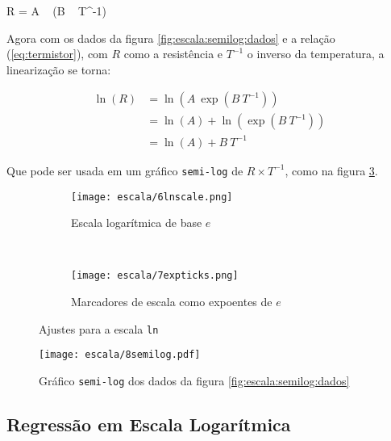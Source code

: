     \begin{equacao} \label{eq:termistor}
        R = A ~ \exp\left(B ~ T^{-1}\right)
    \end{equacao}

    Agora com os dados da figura \ref{fig:escala:semilog:dados} e a relação (\ref{eq:termistor}), com $R$ como a resistência e $T^{-1}$ o inverso da temperatura, a linearização se torna:

    \begin{align*}
        \ln(R)
            &= \ln\left(A ~ \exp\left(B ~ T^{-1}\right) \right) \\
            &= \ln(A) + \ln\left(\exp\left(B ~ T^{-1}\right) \right) \\
            &= \ln(A) + B ~ T^{-1}
    \end{align*}

    Que pode ser usada em um gráfico \texttt{semi-log} de $R \times T^{-1}$, como na figura \ref{fig:escala:tutextra}.

    \begin{figure}[htbp]
        \centering
        \begin{subfigure}{0.45\textwidth}
            \centering
            \texttt{[image: escala/6lnscale.png]}

            \caption{Escala logarítmica de base $e$}
            \label{fig:escala:lnscale}
        \end{subfigure}
        ~
        \begin{subfigure}{0.45\textwidth}
            \centering
            \texttt{[image: escala/7expticks.png]}

            \caption{Marcadores de escala como expoentes de $e$}
            \label{fig:escala:expticks}
        \end{subfigure}
        \caption{Ajustes para a escala \texttt{ln}}
        \label{fig:escala:tutextra}
    \end{figure}

    \begin{figure}[htbp]
        \centering
        \texttt{[image: escala/8semilog.pdf]}

        \caption{Gráfico \texttt{semi-log} dos dados da figura \ref{fig:escala:semilog:dados}}
        \label{fig:escala:semilog:resultado}
    \end{figure}


\subsection{Regressão em Escala Logarítmica}

